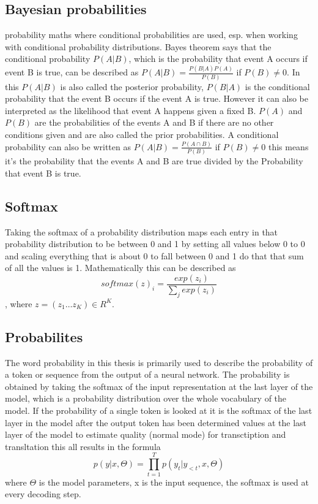 \subsection{Bayesian probabilities}
probability maths where conditional probabilities are used, esp. when working with conditional probability distributions.
Bayes theorem says that the conditional probability $P(A|B)$, which is the probability that event A occurs if event B is true, can be described as $P(A|B)=\frac{P(B|A)P(A)}{P(B)}$ if $P(B)\neq0$. 
In this $P(A|B)$ is also called the posterior probability, $P(B|A)$ is the conditional probability that the event B occurs if the event A is true. 
However it can also be interpreted as the likelihood that event A happens given a fixed B. 
$P(A)$ and $P(B)$ are the probabilities of the events A and B if there are no other conditions given and are also called the prior probabilities. 
A conditional probability can also be written as $P(A|B)=\frac{P(A\cap B)}{P(B)}$ if $P(B)\neq0$ this means it's the probability that the events A and B are true divided by the Probability that event B is true.



\subsection{Softmax}
Taking the softmax of a probability distribution maps each entry in that probability distribution to be between 0 and 1 by setting all values below 0 to 0 and scaling everything that is about 0 to fall between 0 and 1 do that that sum of all the values is 1. 
Mathematically this can be described as $$softmax(z)_i=\frac{exp(z_i)}{\sum_j exp(z_i)}$$, where $z=(z_1\dots z_K)\in R^K$.

\subsection{Probabilites}
The word probability in this thesis is primarily used to describe the probability of a token or sequence from the output of a neural network.
The probability is obtained by taking the softmax of the input representation at the last layer of the model, which is a probability distribution over the whole vocabulary of the model. 
If the probability of a single token is looked at it is the softmax of the last layer in the model after the output token has been determined 
values at the last layer of the model to estimate quality (normal mode) for transctiption and transltation 
this all results in the formula $$p(y|x,\Theta)=\prod_{t=1}^T p(y_t|y_{<t}, x, \Theta) $$ where $\Theta$ is the model parameters, x is the input sequence, the softmax is used at every decoding step.

